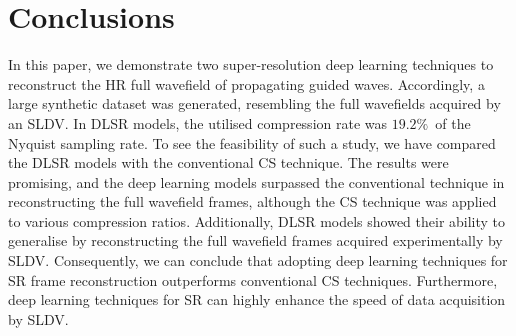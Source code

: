 \section{Conclusions}
\label{conclusion}
In this paper, we demonstrate two super-resolution deep learning techniques to reconstruct the HR full wavefield of propagating guided waves.
Accordingly, a large synthetic dataset was generated, resembling the full wavefields acquired by an SLDV.
In DLSR models, the utilised compression rate was \(19.2\%\)\ of the Nyquist sampling rate.
To see the feasibility of such a study, we have compared the DLSR models with the conventional CS technique. 
The results were promising, and the deep learning models surpassed the conventional technique in reconstructing the full wavefield frames, although the CS technique was applied to various compression ratios.
Additionally, DLSR models showed their ability to generalise by reconstructing the full wavefield frames acquired experimentally by SLDV.
Consequently, we can conclude that adopting deep learning techniques for SR frame reconstruction outperforms conventional CS techniques.
Furthermore, deep learning techniques for SR can highly enhance the speed of data acquisition by SLDV.

